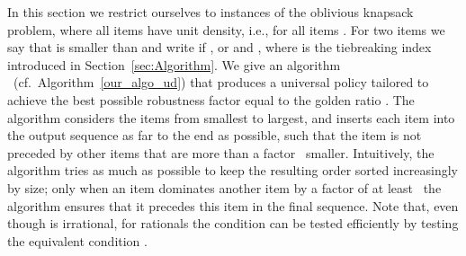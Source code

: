 \documentclass[11pt]{article}
\begin{document}
In this section we restrict ourselves to instances of the oblivious
knapsack problem, where all items have unit density, i.e., 
for all items . For two items  we say that 
is smaller than  and write  if , or 
and , where  is the tiebreaking index introduced in
Section~\ref{sec:Algorithm}. We give an algorithm ~(cf.~Algorithm~\ref{our_algo_ud})
that produces a universal policy tailored to achieve the best possible
robustness factor equal to the golden ratio .
The algorithm considers the items from smallest to largest, and inserts
each item into the output sequence as far to the end as possible,
such that the item is not preceded by other items that are more than
a factor~ smaller. Intuitively, the algorithm tries as
much as possible to keep the resulting order sorted increasingly by
size; only when an item dominates another item by a factor of at least~
the algorithm ensures that it precedes this item in the final sequence.
Note that, even though  is irrational, for rationals 
the condition  can be tested efficiently by testing
the equivalent condition .
\end{document}
